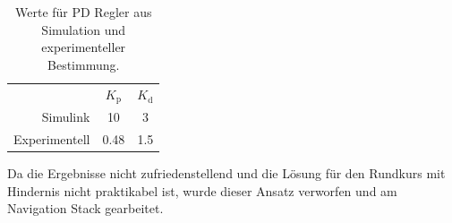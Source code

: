 \begin{table}[h]
	\centering
	\begin{tabular}{rcc}
		 & $K_\text{p}$ & $K_\text{d}$ \\ 
		Simulink & 10 & 3 \\ 
		Experimentell & 0.48 & 1.5
	\end{tabular}
	\caption{Werte f\"ur PD Regler aus Simulation und experimenteller Bestimmung.}
	\label{tab:PD}
\end{table}

Da die Ergebnisse nicht zufriedenstellend und die L\"osung f\"ur den Rundkurs mit Hindernis nicht praktikabel ist, wurde dieser Ansatz verworfen und am Navigation Stack gearbeitet.
